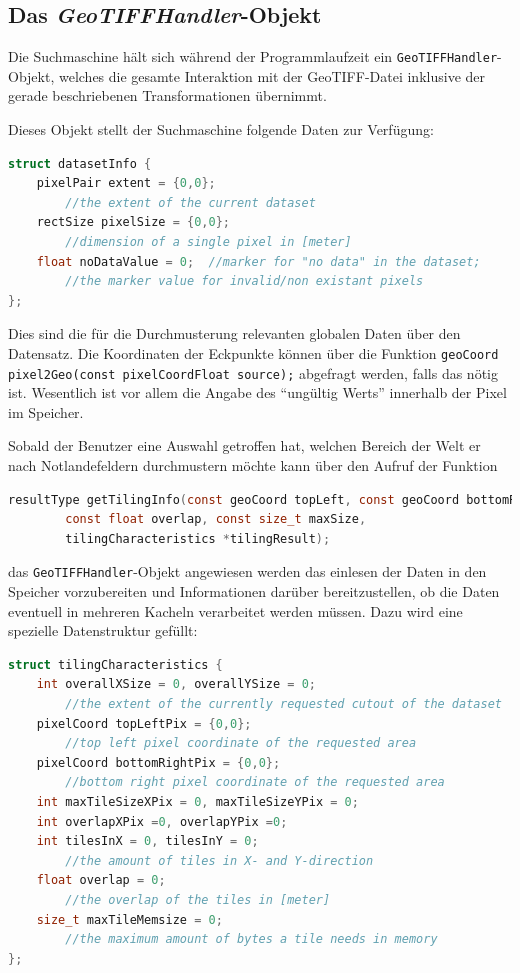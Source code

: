 \documentclass[10pt,a4paper]{report}
\begin{document}
\subsection{Das \emph{GeoTIFFHandler}-Objekt}

Die Suchmaschine hält sich während der Programmlaufzeit ein \texttt{GeoTIFFHandler}-Objekt, welches die gesamte Interaktion mit der GeoTIFF-Datei inklusive der gerade beschriebenen Transformationen übernimmt.

Dieses Objekt stellt der Suchmaschine folgende Daten zur Verfügung:

\begin{lstlisting}[language=c]
struct datasetInfo {
	pixelPair extent = {0,0};	
		//the extent of the current dataset
	rectSize pixelSize = {0,0}; 	
		//dimension of a single pixel in [meter]
	float noDataValue = 0;	//marker for "no data" in the dataset;
		//the marker value for invalid/non existant pixels
};	
\end{lstlisting}

Dies sind die für die Durchmusterung relevanten globalen Daten über den Datensatz. Die Koordinaten der Eckpunkte können über die Funktion \verb|geoCoord pixel2Geo(const pixelCoordFloat source);| abgefragt werden, falls das nötig ist. Wesentlich ist vor allem die Angabe des "`ungültig Werts"' innerhalb der Pixel im Speicher.

Sobald der Benutzer eine Auswahl getroffen hat, welchen Bereich der Welt er nach Notlandefeldern durchmustern möchte kann über den Aufruf der Funktion 
\begin{lstlisting}[language=c]
resultType getTilingInfo(const geoCoord topLeft, const geoCoord bottomRight,
		const float overlap, const size_t maxSize, 
		tilingCharacteristics *tilingResult);
\end{lstlisting}

das \texttt{GeoTIFFHandler}-Objekt angewiesen werden das einlesen der Daten in den Speicher vorzubereiten und Informationen darüber bereitzustellen, ob die Daten eventuell in mehreren Kacheln verarbeitet werden müssen. Dazu wird eine spezielle Datenstruktur gefüllt:
\begin{lstlisting}[language=c]
struct tilingCharacteristics {
	int overallXSize = 0, overallYSize = 0;	
		//the extent of the currently requested cutout of the dataset
	pixelCoord topLeftPix = {0,0};	
		//top left pixel coordinate of the requested area
	pixelCoord bottomRightPix = {0,0};	
		//bottom right pixel coordinate of the requested area
	int maxTileSizeXPix = 0, maxTileSizeYPix = 0;
	int overlapXPix =0, overlapYPix =0;
	int tilesInX = 0, tilesInY = 0;	
		//the amount of tiles in X- and Y-direction
	float overlap = 0;	
		//the overlap of the tiles in [meter]
	size_t maxTileMemsize = 0;	
		//the maximum amount of bytes a tile needs in memory
};
\end{lstlisting}
\end{document}
